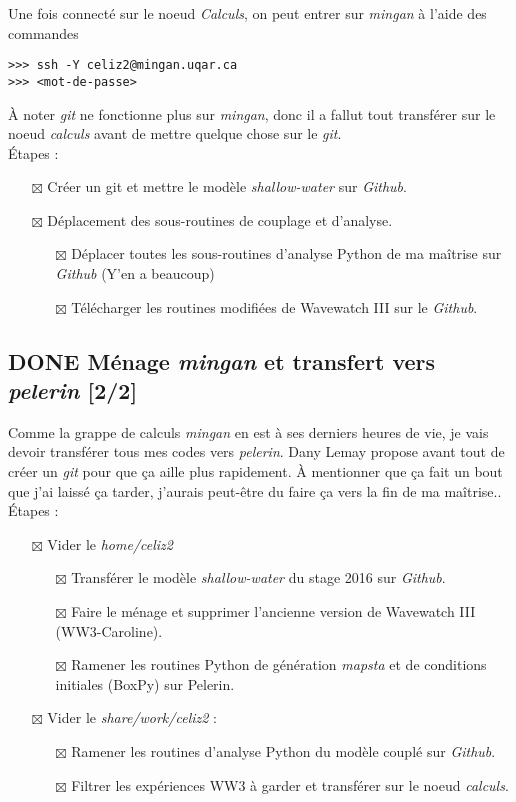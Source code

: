 \documentclass[10pt]{article}
\numberwithin{equation}{section}
\begin{document}
Une fois connecté sur le noeud \emph{Calculs}, on peut entrer sur \emph{mingan} à l'aide des commandes
\begin{verbatim}
>>> ssh -Y celiz2@mingan.uqar.ca
>>> <mot-de-passe>
\end{verbatim}
À noter \emph{git} ne fonctionne plus sur \emph{mingan}, donc il a fallut tout transférer sur le noeud \emph{calculs} avant de mettre quelque chose sur le \emph{git}.\\[0pt]

Étapes : 
\begin{itemize}
\item[{$\boxtimes$}] Créer un git et mettre le modèle \emph{shallow-water} sur \emph{Github}.
\item[{$\boxtimes$}] Déplacement des sous-routines de couplage et d'analyse.
\begin{itemize}
\item[{$\boxtimes$}] Déplacer toutes les sous-routines d'analyse Python de ma maîtrise sur \emph{Github} (Y'en a beaucoup)
\item[{$\boxtimes$}] Télécharger les routines modifiées de Wavewatch III sur le \emph{Github}.
\end{itemize}
\end{itemize}

\subsection{{\bfseries\sffamily DONE} Ménage \emph{mingan} et transfert vers \emph{pelerin} [2/2]}
\label{sec:orgeac8376}
Comme la grappe de calculs \emph{mingan} en est à ses derniers heures de vie, je vais devoir transférer tous mes codes vers \emph{pelerin}.
Dany Lemay propose avant tout de créer un \emph{git} pour que ça aille plus rapidement.
À mentionner que ça fait un bout que j'ai laissé ça tarder, j'aurais peut-être du faire ça vers la fin de ma maîtrise..\\[0pt]

Étapes : 
\begin{itemize}
\item[{$\boxtimes$}] Vider le \emph{home/celiz2}
\begin{itemize}
\item[{$\boxtimes$}] Transférer le modèle \emph{shallow-water} du stage 2016 sur \emph{Github}.
\item[{$\boxtimes$}] Faire le ménage et supprimer l'ancienne version de Wavewatch III (WW3-Caroline).
\item[{$\boxtimes$}] Ramener les routines Python de génération \emph{mapsta} et de conditions initiales (BoxPy) sur Pelerin.
\end{itemize}
\item[{$\boxtimes$}] Vider le \emph{share/work/celiz2} :
\begin{itemize}
\item[{$\boxtimes$}] Ramener les routines d'analyse Python du modèle couplé sur \emph{Github}.
\item[{$\boxtimes$}] Filtrer les expériences WW3 à garder et transférer sur le noeud \emph{calculs}.
\end{itemize}
\end{itemize}
\end{document}
